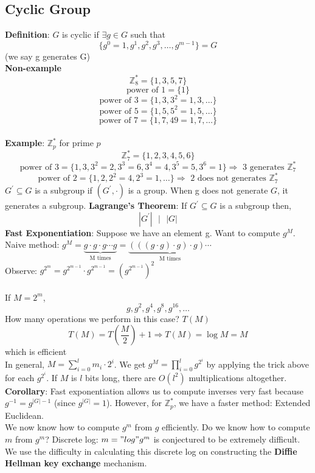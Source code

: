 \documentclass{scribe}
\begin{document}
\subsection{Cyclic Group}
\textbf{Definition}: $G$ is cyclic if $\exists g \in G$ such that
\[\{g^0=1, g^1, g^2,g^3, \dots, g^{m-1}\} = G\] (we say g generates G)
\vspace{3mm}
\\\noindent\textbf{Non-example}
\[\mathbb{Z}_8^{*}=\{1,3,5,7\}\]
\[\text{power of } 1=\{1\}\]
\[\text{power of } 3=\{1, 3, 3^2 = 1, 3, \dots\}\]
\[\text{power of } 5=\{1, 5, 5^2 = 1, 5, \dots \}\]
\[\text{power of } 7=\{1, 7, 49=1, 7, \dots\}\]
\\\noindent\textbf{Example}: $\mathbb{Z}_p^{*}$ for prime $p$
\[\mathbb{Z}_7^{*}=\{1,2,3,4,5,6\}\]
\[\text{power of } 3=\{1, 3, 3^2 = 2, 3^3 = 6, 3^4 = 4, 3^5 = 5, 3^6 = 1\} \Rightarrow \text{ 3 generates }\mathbb{Z}_7^{*}\]
\[\text{power of } 2=\{1, 2, 2^2 = 4, 2^3 = 1, \dots \} \Rightarrow \text{ 2 does not generates }\mathbb{Z}_7^{*}\]
$G^{'} \subseteq G$ is a subgroup if $(G^{'}, \cdot )$ is a group. When g does not generate $G$, it generates a subgroup.
\textbf{Lagrange's Theorem}: If $G^{'} \subseteq G$ is a subgroup then,
\[|G^{'}| \text{ } \bigg| \text{ } |G|\]
\vspace{3mm}
\textbf{Fast Exponentiation}: Suppose we have an element g. Want to compute $g^M$.
\\Naive method: $g^{M} = \underbrace{g \cdot g \cdot g \cdots g}_{\text{M times}} = \underbrace{(((g \cdot g) \cdot g) \cdot g) \cdots}_{\text{M times}} $ %
\\Observe: $g^{2^{m}} = g^{2^{m-1}} \cdot g^{2^{m-1}} = (g^{2^{m-1}})^2$ 
\\\\If $M=2^m$, 
\[ g, g^2, g^4, g^8, g^{16}, \dots \]
How many operations we perform in this case? $T(M)$
\[T(M) = T(\frac{M}{2}) +1 \Rightarrow T(M) = \log{M} = M\] which is efficient
\\In general, $M = \sum_{i=0}^{l}m_i \cdot 2^{i}$. We get $g^{M} = \prod_{i=0}^{l} g^{2^{i}}$ by applying the trick above for each $g^{2^{i}}$. If $M$ is $l$ bits long, there are $O(l^2)$ multiplications altogether.
\vspace{5mm}
\\\noindent\textbf{Corollary}: Fast exponentiation allows us to compute inverses very fast because $g^{-1} = g^{|G|-1}$ (since $g^{|G|} = 1$). However, for $\mathbb{Z}_p^{*}$, we have a faster method: Extended Euclidean.
\\We now know how to compute $g^m$ from $g$ efficiently. Do we know how to compute $m$ from $g^m$? Discrete log: $m="log" g^m$ is conjectured to be extremely difficult. We use the difficulty in calculating this discrete log on constructing the \textbf{Diffie Hellman key exchange} mechanism.
\end{document}
